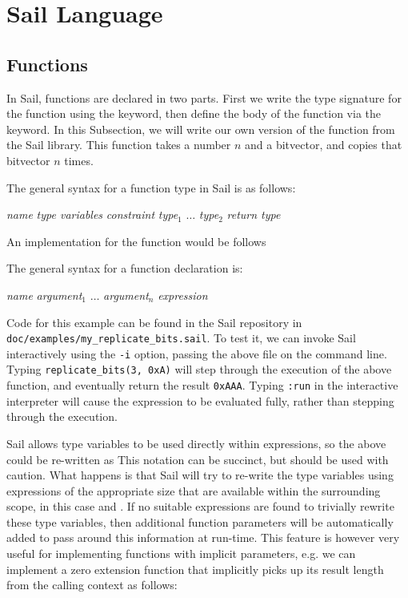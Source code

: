 \section{Sail Language}

\subsection{Functions}
\label{sec:functions}



In Sail, functions are declared in two parts. First we write the type
signature for the function using the  keyword, then define the
body of the function via the  keyword. In this
Subsection, we will write our own version of the 
function from the Sail library. This function takes a number $n$ and a
bitvector, and copies that bitvector $n$ times.

\mrbmyreplicatebits

\noindent The general syntax for a function type in Sail is as follows:
\begin{center}
   \textit{name} \ll{:}  \textit{type variables} \ll{,} \textit{constraint}  \textit{type$_1$} \ll{,} $\ldots$ \ll{,} \textit{type$_2$} \ll{)} \ll{->} \textit{return type}
\end{center}
An implementation for the  function would be
follows \mrbfnmyreplicatebits

The general syntax for a function declaration is:
\begin{center}
   \textit{name} \ll{(} \textit{argument$_1$} \ll{,} $\ldots$ \ll{,} \textit{argument$_n$} \ll{)} \ll{=} \textit{expression}
\end{center}

Code for this example can be found in
the Sail repository in \verb|doc/examples/my_replicate_bits.sail|. To
test it, we can invoke Sail interactively using the \verb|-i| option,
passing the above file on the command line. Typing
\verb|replicate_bits(3, 0xA)| will step through the execution of the
above function, and eventually return the result \verb|0xAAA|. Typing
\verb|:run| in the interactive interpreter will cause the expression
to be evaluated fully, rather than stepping through the execution.

Sail allows type variables to be used directly within expressions, so
the above could be re-written as \mrbfnmyreplicatebitstwo This
notation can be succinct, but should be used with caution. What
happens is that Sail will try to re-write the type variables using
expressions of the appropriate size that are available within the
surrounding scope, in this case  and . If no
suitable expressions are found to trivially rewrite these type
variables, then additional function parameters will be automatically
added to pass around this information at run-time. This feature is
however very useful for implementing functions with implicit
parameters, e.g. we can implement a zero extension function that
implicitly picks up its result length from the calling context as
follows:
\mrbextzz
\mrbfnextzz


